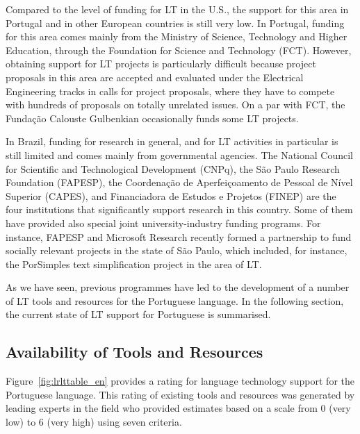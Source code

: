 \begin{multicols}{2}
Compared to the level of funding for LT in the U.S., the support for this area in Portugal and in other European countries is still very low. In Portugal, funding for this area comes mainly from the Ministry of Science, Technology and Higher Education, through the Foundation for Science and Technology (FCT). However, obtaining support for LT projects is particularly difficult because project proposals in this area are accepted and evaluated under the Electrical Engineering tracks in calls for project proposals, where they have to compete with hundreds of proposals on totally unrelated issues. On a par with FCT, the Fundação Calouste Gulbenkian occasionally funds some LT projects.

In Brazil, funding for research in general, and for LT activities in particular is still limited and comes mainly from governmental agencies. The National Council for Scientific and Technological Development (CNPq), the São Paulo Research Foundation (FAPESP), the Coordenação de Aperfeiçoamento de Pessoal de Nível Superior (CAPES), and Financiadora de Estudos e Projetos (FINEP) are the four institutions that significantly support research in this country. Some of them have provided also special joint university-industry funding programs. For instance, FAPESP and Microsoft Research recently formed a partnership to fund socially relevant projects in the state of São Paulo, which included, for instance, the PorSimples\cite{porsimples} text simplification project in the area of LT. 

As we have seen, previous programmes have led to the development of a number of LT tools and resources for the Portuguese language. In the following section, the current state of LT support for Portuguese is summarised.
  
\subsection{Availability of Tools and Resources}

Figure~\ref{fig:lrlttable_en} provides a rating for language technology support for the Portuguese language. This rating of existing tools and resources was generated by leading experts in the field who provided estimates based on a scale from 0 (very low) to 6 (very high) using seven criteria.


\end{multicols}
